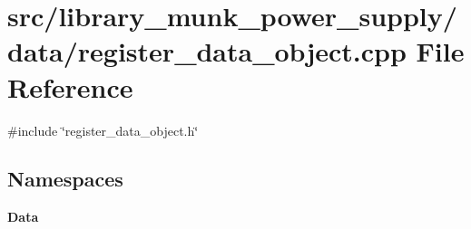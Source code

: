 \section{src/library\+\_\+munk\+\_\+power\+\_\+supply/data/register\+\_\+data\+\_\+object.cpp File Reference}
\label{register__data__object_8cpp}
{\ttfamily \#include \char`\"{}register\+\_\+data\+\_\+object.\+h\char`\"{}}\newline
\subsection*{Namespaces}
\begin{DoxyCompactItemize}
\item 
 \textbf{ Data}
\end{DoxyCompactItemize}
